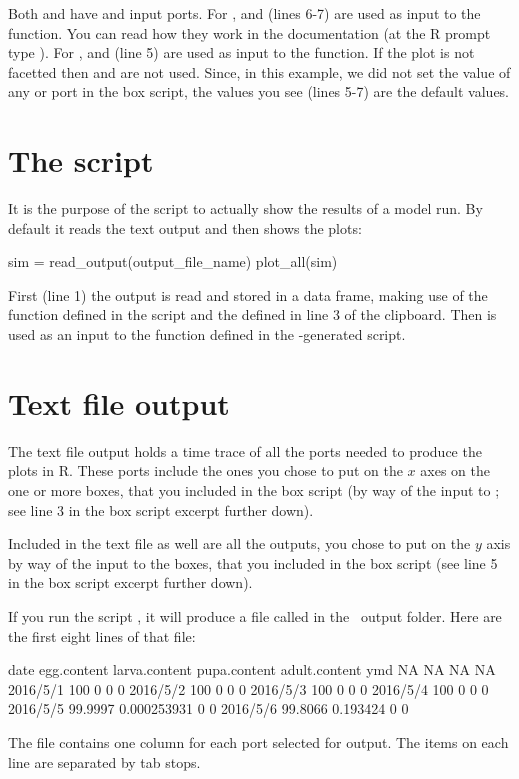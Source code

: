 Both  and  have  and  input ports.  For ,  and  (lines 6-7) are used as input to the  function. You can read how they work in the  documentation (at the R prompt type ). For ,  and  (line 5) are used as input to the  function. If the plot is not facetted then  and  are not used. Since, in this example, we did not set the value of any  or  port in the box script, the values you see (lines 5-7) are the default values.

\section{The  script}
It is the purpose of the  script to actually show the results of a model run. By default it reads the text output and then shows the plots:

\lstset{numbers=left}
\begin{rscript}
sim = read_output(output_file_name)
plot_all(sim)
\end{rscript}
\lstset{numbers=none}
First (line 1) the output is read and stored in a  data frame, making use of the  function defined in the 
 script and the  defined in line 3 of the clipboard. Then  is used as an input to the  function defined in the \US-generated script.

\section{Text file output}
The text file output  holds a time trace of all the ports needed to produce the plots in R. These ports include the ones you chose to put on the \(x\) axes on the one or more  boxes, that you included in the box script (by way of the  input to ; see line 3 in the box script excerpt further down).

Included in the text file as well are all the outputs, you chose to put on the \(y\) axis by way of the  input to the  boxes, that you included in the box script (see line 5 in the box script excerpt further down).

If you run the script , it will produce a file called  in the \US\ output folder. Here are the first eight lines of that file:
\begin{usoutput}
date egg.content larva.content pupa.content adult.content
ymd NA NA NA NA
2016/5/1 100 0 0 0
2016/5/2 100 0 0 0
2016/5/3 100 0 0 0
2016/5/4 100 0 0 0
2016/5/5 99.9997 0.000253931 0 0
2016/5/6 99.8066 0.193424 0 0
\end{usoutput}
The file contains one column for each port selected for output. The items on each line are separated by tab stops.


